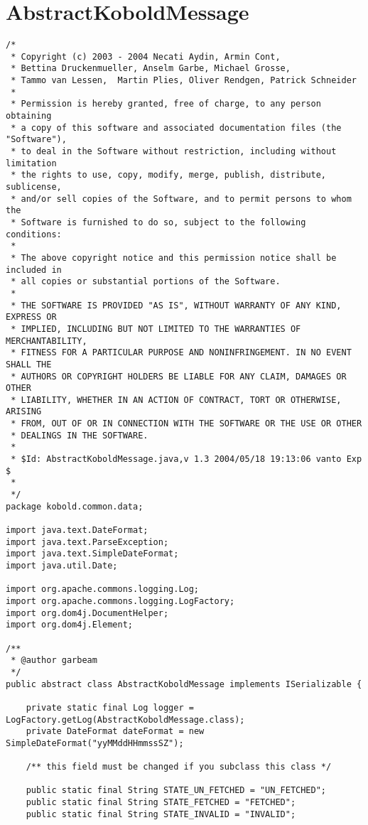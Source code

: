 \section{AbstractKoboldMessage}
\small \begin{verbatim}
/*
 * Copyright (c) 2003 - 2004 Necati Aydin, Armin Cont, 
 * Bettina Druckenmueller, Anselm Garbe, Michael Grosse, 
 * Tammo van Lessen,  Martin Plies, Oliver Rendgen, Patrick Schneider
 * 
 * Permission is hereby granted, free of charge, to any person obtaining
 * a copy of this software and associated documentation files (the "Software"),
 * to deal in the Software without restriction, including without limitation
 * the rights to use, copy, modify, merge, publish, distribute, sublicense, 
 * and/or sell copies of the Software, and to permit persons to whom the 
 * Software is furnished to do so, subject to the following conditions:
 *
 * The above copyright notice and this permission notice shall be included in 
 * all copies or substantial portions of the Software.
 *
 * THE SOFTWARE IS PROVIDED "AS IS", WITHOUT WARRANTY OF ANY KIND, EXPRESS OR 
 * IMPLIED, INCLUDING BUT NOT LIMITED TO THE WARRANTIES OF MERCHANTABILITY, 
 * FITNESS FOR A PARTICULAR PURPOSE AND NONINFRINGEMENT. IN NO EVENT SHALL THE 
 * AUTHORS OR COPYRIGHT HOLDERS BE LIABLE FOR ANY CLAIM, DAMAGES OR OTHER 
 * LIABILITY, WHETHER IN AN ACTION OF CONTRACT, TORT OR OTHERWISE, ARISING 
 * FROM, OUT OF OR IN CONNECTION WITH THE SOFTWARE OR THE USE OR OTHER 
 * DEALINGS IN THE SOFTWARE.
 *
 * $Id: AbstractKoboldMessage.java,v 1.3 2004/05/18 19:13:06 vanto Exp $
 *
 */
package kobold.common.data;

import java.text.DateFormat;
import java.text.ParseException;
import java.text.SimpleDateFormat;
import java.util.Date;

import org.apache.commons.logging.Log;
import org.apache.commons.logging.LogFactory;
import org.dom4j.DocumentHelper;
import org.dom4j.Element;

/**
 * @author garbeam
 */
public abstract class AbstractKoboldMessage implements ISerializable {

	private static final Log logger = LogFactory.getLog(AbstractKoboldMessage.class);
	private DateFormat dateFormat = new SimpleDateFormat("yyMMddHHmmssSZ");
	
	/** this field must be changed if you subclass this class */
	
	public static final String STATE_UN_FETCHED = "UN_FETCHED"; 
	public static final String STATE_FETCHED = "FETCHED";
	public static final String STATE_INVALID = "INVALID";
	

\end{verbatim}
